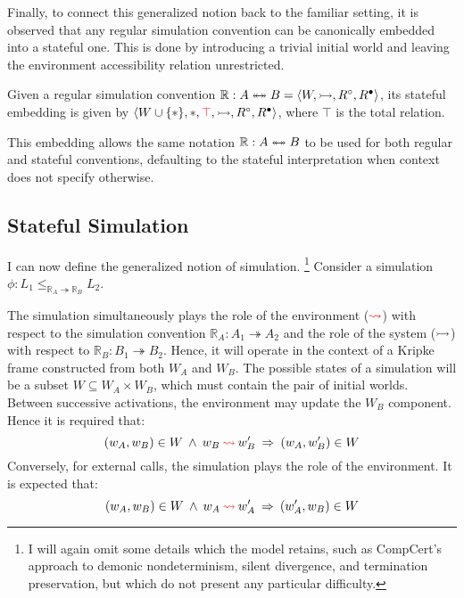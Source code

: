 Finally, to connect this generalized notion
back to the familiar setting,
it is observed that
any regular simulation convention
can be canonically embedded into a stateful one.
This is done
by introducing a trivial initial world
and leaving the environment accessibility relation unrestricted.

\begin{definition}
  Given a regular simulation convention
  $\mathbb{R} : A \twoheadleftarrow \mathrel{\mkern-15mu} \twoheadrightarrow B = \langle W, \rightarrowtail, R^\circ, R^\bullet \rangle$,
  its stateful embedding is given by
  $
  \langle
  W \cup \{*\},
  *,
  \textcolor{red}{\top},
  \rightarrowtail,
  R^\circ,
  R^\bullet
  \rangle
  $,
  where $\top$ is the total relation.
\end{definition}
This embedding allows the same notation $\mathbb{R} : A \twoheadleftarrow \mathrel{\mkern-15mu} \twoheadrightarrow B$
to be used for both regular and stateful conventions,
defaulting to the stateful interpretation
when context does not specify otherwise.

\subsection{Stateful Simulation}

I can now define the generalized notion of simulation.%
\footnote{
  I will again omit some details
  which the model retains,
  such as CompCert's approach to
  demonic nondeterminism,
  silent divergence,
  and termination preservation,
  but which do not present any particular difficulty.
}
Consider a simulation
$
\phi : L_1 \le_{\mathbb{R}_A \twoheadrightarrow \mathbb{R}_B} L_2
$.

The simulation simultaneously
plays the role of the environment ($\textcolor{red}{\leadsto}$) with respect to
the simulation convention $\mathbb{R}_A : A_1 \twoheadrightarrow A_2$ and
the role of the system ($\rightarrowtail$) with respect to $\mathbb{R}_B : B_1 \twoheadrightarrow B_2$.
Hence,
it will operate in the context of a Kripke frame
constructed from both $W_A$ and $W_B$.
The possible states of a simulation will be a subset
$W \subseteq W_A \times W_B$,
which must contain
the pair of initial worlds.
Between successive activations,
the environment may update the $W_B$ component.
Hence it is required that:
\[
  (w_A, w_B) \in W \:\wedge\:
  w_B \mathbin{\textcolor{red}{\leadsto}} w_B' \:\Rightarrow\:
  (w_A, w_B') \in W
\]
Conversely, for external calls,
the simulation plays the role of the environment.
It is expected that:
\[
  (w_A, w_B) \in W \:\wedge\:
  w_A \mathbin{\textcolor{red}{\leadsto}} w_A' \:\Rightarrow\:
  (w_A', w_B) \in W
\]


